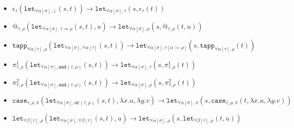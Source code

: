 \documentclass[runningheads,a4paper]{llncs}
\newcommand{\TypeConstructors}{\mathcal{C}}
\newcommand{\quant}[2]{\forall #1[#2]}
\newcommand{\qquant}[3]{#1 #2[#3]}
\newcommand{\arrtype}{\Rightarrow}
\newcommand{\abs}[2]{\lambda #1.#2}
\begin{document}
\begin{itemize}
\item $\epsilon_\tau(\mathtt{let}_{\qquant{\forall}{\alpha}{\sigma},
  \bot}(s,t)) \to
  \mathtt{let}_{\qquant{\forall}{\alpha}{\sigma},\tau}(s,\epsilon_\tau(t))$
\item $@_{\tau,\rho}(\mathtt{let}_{\qquant{\forall}{\alpha}{\sigma},
  \tau \arrtype \rho}(s,t),u) \to
  \mathtt{let}_{\qquant{\forall}{\alpha}{\sigma},\rho}(s,@_{\tau,\rho}(t,
  u))$
\item $\mathtt{tapp}_{\quant{\alpha}{\tau},\rho}(
\mathtt{let}_{\qquant{\forall}{\alpha}{\sigma},\quant{\alpha}{\tau}}(s,t))
  \to
  \mathtt{let}_{\qquant{\forall}{\alpha}{\sigma},\tau[\alpha:=\rho]}(s,
  \mathtt{tapp}_{\quant{\alpha}{\tau},\rho}(t))$
\item $\pi^1_{\tau,\rho}(\mathtt{let}_{\qquant{\forall}{\alpha}{\sigma},
  \mathtt{and}(\tau,\rho)}(s,t)) \to
  \mathtt{let}_{\qquant{\forall}{\alpha}{\sigma},\tau}(s,\pi^1_{\tau,
  \rho}(t))$
\item $\pi^2_{\tau,\rho}(\mathtt{let}_{\qquant{\forall}{\alpha}{\sigma},
  \mathtt{and}(\tau,\rho)}(s,t)) \to
  \mathtt{let}_{\qquant{\forall}{\alpha}{\sigma},\rho}(s,\pi^2_{\tau,
  \rho}(t))$
\item $\mathtt{case}_{\tau,\rho,\pi}(
  \mathtt{let}_{\qquant{\forall}{\alpha}{\sigma},\mathtt{or}(\tau,
  \rho)}(s,t),\abs{x}{u},\abs{y}{v}) \to
  \mathtt{let}_{\qquant{\forall}{\alpha}{\sigma},\pi}(s,\mathtt{case}_{
  \tau,\rho,\pi}(t,\abs{x}{u},\abs{y}{v}))$
\item $\mathtt{let}_{\qquant{\forall}{\beta}{\tau},\rho}(\mathtt{let}_{\qquant{\forall}{\alpha}{\sigma},\qquant{\forall}{\beta}{\tau}}(s,t),u) \to
  \mathtt{let}_{\qquant{\forall}{\alpha}{\sigma},\rho}(s,\mathtt{let}_{\qquant{\forall}{\beta}{\tau},\rho}(t,u))$
\end{itemize}

%
%
\end{document}
